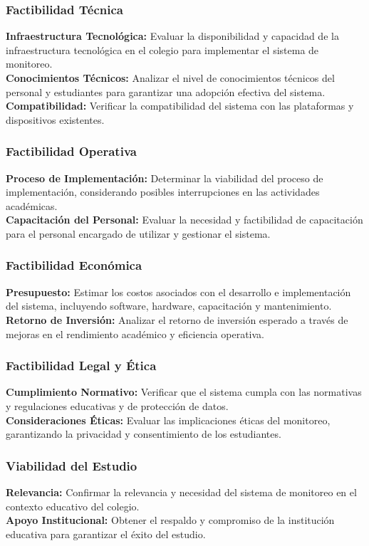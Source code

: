\documentclass[12pt]{article}
\begin{document}
\subsubsection*{Factibilidad Técnica}
\textbf{Infraestructura Tecnológica:} Evaluar la disponibilidad y capacidad de la infraestructura tecnológica en el colegio para implementar el sistema de monitoreo.\\
\textbf{Conocimientos Técnicos:} Analizar el nivel de conocimientos técnicos del personal y estudiantes para garantizar una adopción efectiva del sistema.\\
\textbf{Compatibilidad:} Verificar la compatibilidad del sistema con las plataformas y dispositivos existentes.
\subsubsection*{Factibilidad Operativa}
\textbf{Proceso de Implementación:} Determinar la viabilidad del proceso de implementación, considerando posibles interrupciones en las actividades académicas.\\
\textbf{Capacitación del Personal:} Evaluar la necesidad y factibilidad de capacitación para el personal encargado de utilizar y gestionar el sistema.
\subsubsection{Factibilidad Económica}
\textbf{Presupuesto:} Estimar los costos asociados con el desarrollo e implementación del sistema, incluyendo software, hardware, capacitación y mantenimiento.\\
\textbf{Retorno de Inversión:} Analizar el retorno de inversión esperado a través de mejoras en el rendimiento académico y eficiencia operativa.
\subsubsection*{Factibilidad Legal y Ética}
\textbf{Cumplimiento Normativo:} Verificar que el sistema cumpla con las normativas y regulaciones educativas y de protección de datos.\\
\textbf{Consideraciones Éticas:} Evaluar las implicaciones éticas del monitoreo, garantizando la privacidad y consentimiento de los estudiantes.
\subsubsection*{Viabilidad del Estudio}
\textbf{Relevancia:} Confirmar la relevancia y necesidad del sistema de monitoreo en el contexto educativo del colegio.\\
\textbf{Apoyo Institucional:} Obtener el respaldo y compromiso de la institución educativa para garantizar el éxito del estudio.    
\end{document}
